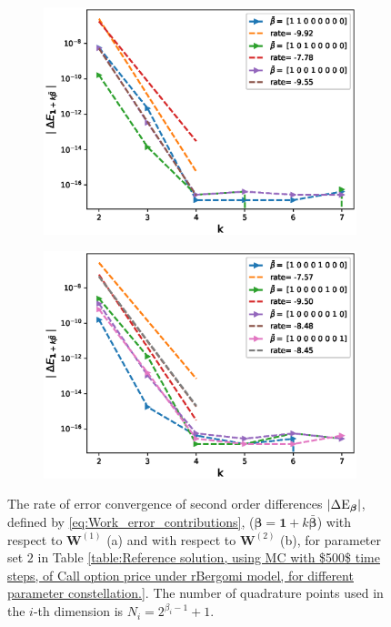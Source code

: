 \begin{figure}[h!]
	\centering
	\begin{subfigure}{.4\textwidth}
		\centering
		\includegraphics[width=1\linewidth]{./figures/rBergomi_mixed_error_rates/without_change_measure/N_4/H_002/mixed_difference_order2_rbergomi_4steps_H_002_K_1_totally_hierarch_with_rate_W1}
		\caption{}
		\label{fig:sub3}
	\end{subfigure}%
	\begin{subfigure}{.4\textwidth}
		\centering
		\includegraphics[width=1\linewidth]{./figures/rBergomi_mixed_error_rates/without_change_measure/N_4/H_002/mixed_difference_order2_rbergomi_4steps_H_002_K_1_totally_hierarch_with_rate_W2}
		\caption{}
		\label{fig:sub4}
	\end{subfigure}
	
	\caption{The rate of error convergence of  second order differences $\left\lvert\Delta \text{E}_{\boldsymbol{\beta}}\right\rvert$, defined by \eqref{eq:Work_error_contributions},  ($\boldsymbol{\beta}=\mathbf{1}+k \bar{\boldsymbol{\beta}}$) with respect to $\mathbf{W}^{(1)}$ (a)  and  with respect to $\mathbf{W}^{(2)}$ (b), for parameter set $2$ in Table \ref{table:Reference solution, using MC with $500$ time steps, of Call option price under rBergomi model, for different parameter constellation.}. The number of quadrature points used in the $i$-th dimension is $N_i=2^{\beta_i-1}+1$.}
	\label{fig:second_diff_comp_K_1_H_002}
\end{figure}

